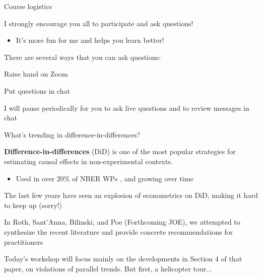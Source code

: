 \documentclass[aspectratio = 169, 12pt]{beamer}
\begin{document}
\begin{frame}{Course logistics}
  \begin{wideitemize}
    \item
    I strongly encourage you all to participate and ask questions!
    \begin{itemize}
      \item
            It's more fun for me and helps you learn better!
    \end{itemize}
    \item
    There are several ways that you can ask questions:

    \begin{wideitemize}
      \item
      Raise hand on Zoom

      \item
      Put questions in chat
    \end{wideitemize}

    \item
    I will pause periodically for you to ask live questions and to review messages in chat
  \end{wideitemize}

\end{frame}


\begin{frame}{What's trending in difference-in-differences?}
  \begin{wideitemize}
    \item
    \textbf{Difference-in-differences} (DiD) is one of the most popular strategies for estimating causal effects in non-experimental contexts.
    \medskip
    \begin{itemize}
      \item
            Used in over 20\% of NBER WPs \citep{currie_technology_2020}, and growing over time
    \end{itemize}

    \item
    The last few years have seen an explosion of econometrics on DiD, making it hard to keep up (sorry!)

    \item
    In Roth, Sant'Anna, Bilinski, and Poe (Forthcoming JOE), we attempted to synthesize the recent literature and provide concrete recommendations for practitioners


    \item
    Today's workshop will focus mainly on the developments in Section 4 of that paper, on violations of parallel trends. But first, a helicopter tour...
  \end{wideitemize}
\end{frame}
\end{document}
